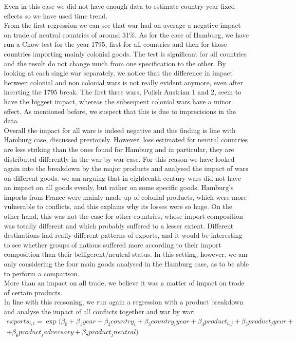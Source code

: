\documentclass[12pt,a4paper,titlepage,english]{article}
\begin{document}
 Even in this case we did not have enough data to estimate country year fixed effects so we have used time trend.\\
From the first regression we can see that war had on average a negative impact on trade of neutral countries of around 31\%. As for the case of Hamburg, we have run a Chow test for the year 1795, first for all countries and then for those countries importing mainly colonial goods. The test is significant for all countries and the result do not change much from one specification to the other. 
By looking at each single war separately, we notice that the difference in impact between colonial and non colonial wars is not really evident anymore, even after inserting the 1795 break. The first three wars, Polish Austrian 1 and 2, seem to have the biggest impact, whereas the subsequent colonial wars have a minor effect. As mentioned before, we suspect that this is due to imprecisions in the data. \\
Overall the impact for all wars is indeed negative and this finding is line with Hamburg case, discussed previously. However, loss estimated for neutral countries are less striking than the ones found for Hamburg and in particular, they are distributed differently  in the war by war case.
For this reason we have looked again into the breakdown by the major products and analysed the impact of wars on different goods. we am arguing that in eighteenth century wars did not have an impact on all goods evenly, but rather on some specific goods. Hamburg's imports from France were mainly made up of colonial products, which were more vulnerable to conflicts, and this explains why its losses were so huge. On the other hand, this was not the case for other countries, whose import composition was totally different and which probably suffered to a lesser extent. Different destinations had really different patterns of exports, and it would be interesting to see whether groups of nations suffered more according to their import composition than their belligerent/neutral status. 
In this setting, however, we am only considering the four main goods analysed in the Hamburg case, as to be able to perform a comparison.\\
More than an impact on all trade, we believe it was a matter of impact on trade of certain products. \\
In line with this reasoning, we run again a regression with a product breakdown and analyse the impact of all conflicts together and war by war:
\begin{multline}
exports_{i,t}=\exp(\beta_0+\beta_1year +\beta_2country_i+\beta_3country_iyear+\beta_4product_{i,j}+\beta_5product_jyear+\\+\beta_6product_jadversary + \beta_7product_jneutral)
\end{multline}
\end{document}
